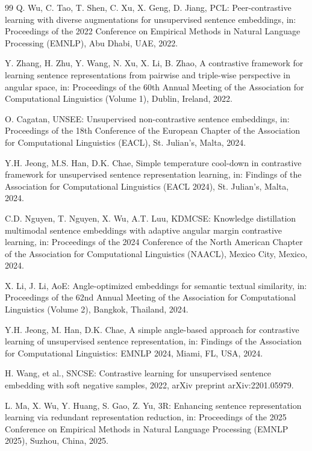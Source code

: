 \documentclass[a4paper,fleqn]{cas-dc}
\begin{document}
\begin{thebibliography}{99}
Q. Wu, C. Tao, T. Shen, C. Xu, X. Geng, D. Jiang, PCL: Peer-contrastive learning with diverse augmentations for unsupervised sentence embeddings, in: Proceedings of the 2022 Conference on Empirical Methods in Natural Language Processing (EMNLP), Abu Dhabi, UAE, 2022.

Y. Zhang, H. Zhu, Y. Wang, N. Xu, X. Li, B. Zhao, A contrastive framework for learning sentence representations from pairwise and triple-wise perspective in angular space, in: Proceedings of the 60th Annual Meeting of the Association for Computational Linguistics (Volume 1), Dublin, Ireland, 2022.

O. Cagatan, UNSEE: Unsupervised non-contrastive sentence embeddings, in: Proceedings of the 18th Conference of the European Chapter of the Association for Computational Linguistics (EACL), St. Julian's, Malta, 2024.

Y.H. Jeong, M.S. Han, D.K. Chae, Simple temperature cool-down in contrastive framework for unsupervised sentence representation learning, in: Findings of the Association for Computational Linguistics (EACL 2024), St. Julian's, Malta, 2024.

C.D. Nguyen, T. Nguyen, X. Wu, A.T. Luu, KDMCSE: Knowledge distillation multimodal sentence embeddings with adaptive angular margin contrastive learning, in: Proceedings of the 2024 Conference of the North American Chapter of the Association for Computational Linguistics (NAACL), Mexico City, Mexico, 2024.

X. Li, J. Li, AoE: Angle-optimized embeddings for semantic textual similarity, in: Proceedings of the 62nd Annual Meeting of the Association for Computational Linguistics (Volume 2), Bangkok, Thailand, 2024.

Y.H. Jeong, M. Han, D.K. Chae, A simple angle-based approach for contrastive learning of unsupervised sentence representation, in: Findings of the Association for Computational Linguistics: EMNLP 2024, Miami, FL, USA, 2024.

H. Wang, et al., SNCSE: Contrastive learning for unsupervised sentence embedding with soft negative samples, 2022, arXiv preprint arXiv:2201.05979.

L. Ma, X. Wu, Y. Huang, S. Gao, Z. Yu, 3R: Enhancing sentence representation learning via redundant representation reduction, in: Proceedings of the 2025 Conference on Empirical Methods in Natural Language Processing (EMNLP 2025), Suzhou, China, 2025.


\end{thebibliography}
\end{document}
